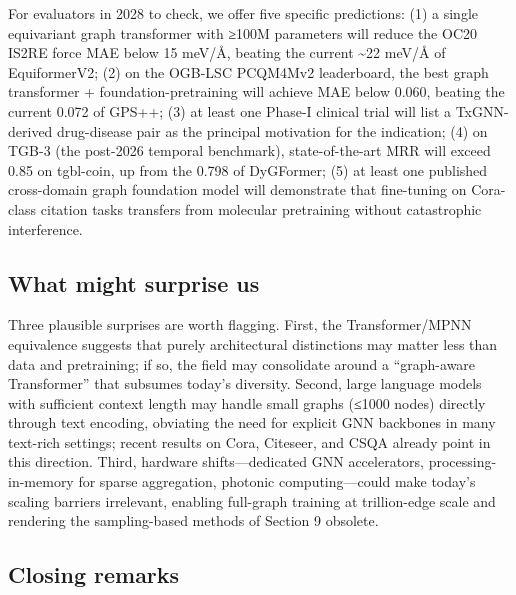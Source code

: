 \documentclass{article}
\begin{document}
For evaluators in 2028 to check, we offer five specific predictions: (1) a single equivariant graph transformer with ≥100M parameters will reduce the OC20 IS2RE force MAE below 15 meV/Å, beating the current \textasciitilde22 meV/Å of EquiformerV2; (2) on the OGB-LSC PCQM4Mv2 leaderboard, the best graph transformer + foundation-pretraining will achieve MAE below 0.060, beating the current 0.072 of GPS++; (3) at least one Phase-I clinical trial will list a TxGNN-derived drug-disease pair as the principal motivation for the indication; (4) on TGB-3 (the post-2026 temporal benchmark), state-of-the-art MRR will exceed 0.85 on tgbl-coin, up from the 0.798 of DyGFormer; (5) at least one published cross-domain graph foundation model will demonstrate that fine-tuning on Cora-class citation tasks transfers from molecular pretraining without catastrophic interference.

\subsection{What might surprise us}\label{what-might-surprise-us}

Three plausible surprises are worth flagging. First, the Transformer/MPNN equivalence \citep{joshi2025transformersaregra} suggests that purely architectural distinctions may matter less than data and pretraining; if so, the field may consolidate around a ``graph-aware Transformer'' that subsumes today's diversity. Second, large language models with sufficient context length may handle small graphs (≤1000 nodes) directly through text encoding, obviating the need for explicit GNN backbones in many text-rich settings; recent results on Cora, Citeseer, and CSQA already point in this direction. Third, hardware shifts---dedicated GNN accelerators, processing-in-memory for sparse aggregation, photonic computing---could make today's scaling barriers irrelevant, enabling full-graph training at trillion-edge scale and rendering the sampling-based methods of Section 9 obsolete.

\subsection{Closing remarks}\label{closing-remarks}
\end{document}
